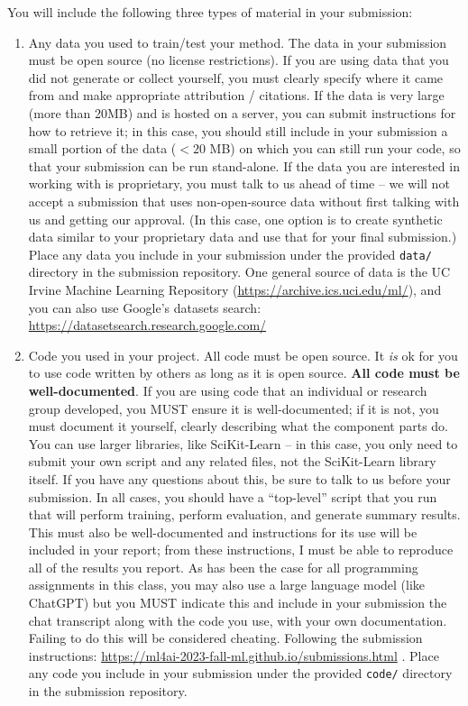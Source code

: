 \documentclass[10pt]{article}
\begin{document}
You will include the following three types of material in your submission:
\begin{enumerate}
\item Any data you used to train/test your method. The data in your submission must be open source (no license restrictions). If you are using data that you did not generate or collect yourself, you must clearly specify where it came from and make appropriate attribution / citations. If the data is very large (more than 20MB) and is hosted on a server, you can submit instructions for how to retrieve it; in this case, you should still include in your submission a small portion of the data ($< 20$ MB) on which you can still run your code, so that your submission can be run stand-alone.  If the data you are interested in working with is proprietary, you must talk to us ahead of time -- we will not accept a submission that uses non-open-source data without first talking with us and getting our approval.  (In this case, one option is to create synthetic data similar to your proprietary data and use that for your final submission.) Place any data you include in your submission under the provided {\tt data/} directory in the submission repository.
One general source of data is the UC Irvine Machine Learning Repository (\url{https://archive.ics.uci.edu/ml/}), and you can also use Google's datasets search: \url{https://datasetsearch.research.google.com/}
\item Code you used in your project.  All code must be open source.  It {\em is} ok for you to use code written by others as long as it is open source. {\bf All code must be well-documented}.  If you are using code that an individual or research group developed, you MUST ensure it is well-documented; if it is not, you must document it yourself, clearly describing what the component parts do.  You can use larger libraries, like SciKit-Learn -- in this case, you only need to submit your own script and any related files, not the SciKit-Learn library itself. If you have any questions about this, be sure to talk to us before your submission.  In all cases, you should have a ``top-level'' script that you run that will perform training, perform evaluation, and generate summary results. This must also be well-documented and instructions for its use will be included in your report; from these instructions, I must be able to reproduce all of the results you report. As has been the case for all programming assignments in this class, you may also use a large language model (like ChatGPT) but you MUST indicate this and include in your submission the chat transcript along with the code you use, with your own documentation. Failing to do this will be considered cheating. Following the submission instructions: \url{https://ml4ai-2023-fall-ml.github.io/submissions.html} . Place any code you include in your submission under the provided {\tt code/} directory in the submission repository.

\end{enumerate}
\end{document}
